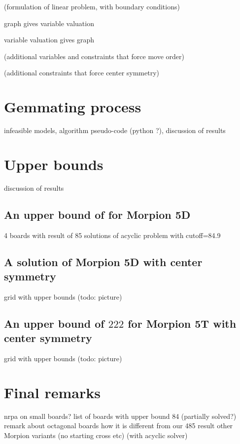 \documentclass[a4paper,UKenglish]{lipics}
\begin{document}
(formulation of linear problem, with boundary conditions)

\begin{theorem}
  graph gives variable valuation
\end{theorem}

\begin{theorem}
  variable valuation gives graph
\end{theorem}

(additional variables and constraints that force move order)

(additional constraints that force center symmetry)

\section{Gemmating process}

  infeasible models, 
  algorithm pseudo-code (python ?),
  discussion of results

\section{Upper bounds}

  discussion of results
  
\subsection{An upper bound of \therecord for Morpion 5D}

  4 boards with result of 85
  solutions of acyclic problem with cutoff=84.9

\subsection{A solution of Morpion 5D with center symmetry}

  grid with upper bounds (todo: picture)
  
\subsection{An upper bound of $222$ for Morpion 5T with center symmetry}

  grid with upper bounds (todo: picture)

\section{Final remarks}
  nrpa on small boards?
  list of boards with upper bound 84 (partially solved?)
  remark about octagonal boards
  how it is different from our 485 result
  other Morpion variants (no starting cross etc)
    (with acyclic solver)

\printbibliography 
%
    
\end{document}
